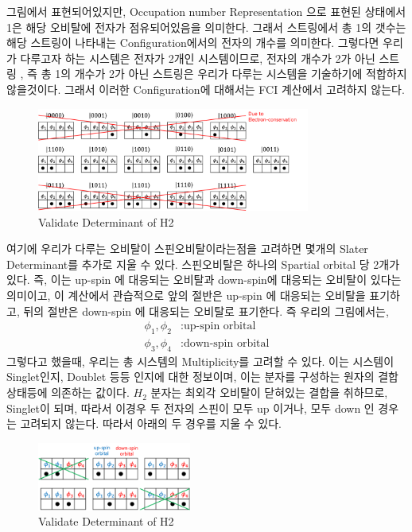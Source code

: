\documentclass[10pt]{article}
\begin{document}
그림에서 표현되어있지만, Occupation number Representation 으로 표현된 상태에서 1은 해당 오비탈에 전자가 점유되어있음을 의미한다. 
그래서 스트링에서 총 1의 갯수는 해당 스트링이 나타내는 Configuration에서의 전자의 개수를 의미한다. 
그렇다면 우리가 다루고자 하는 시스템은 전자가 2개인 시스템이므로, 전자의 개수가 2가 아닌 스트링 , 즉 총 1의 개수가 2가 아닌 스트링은 우리가 다루는 시스템을 기술하기에 적합하지 않을것이다. 
그래서 이러한 Configuration에 대해서는 FCI 계산에서 고려하지 않는다. 
\begin{figure}[htbp]
  \centering
  \includegraphics[width=0.8\textwidth]{fig/Elec_cons.png}
  \caption{Validate Determinant of H2}
  \label{fig:example2}
\end{figure}
여기에 우리가 다루는 오비탈이 스핀오비탈이라는점을 고려하면 몇개의 Slater Determinant를 추가로 지울 수 있다. 
스핀오비탈은 하나의 Spartial orbital 당 2개가 있다. 즉, 이는 up-spin 에 대응되는 오비탈과 down-spin에 대응되는 오비탈이 있다는 의미이고, 
이 계산에서 관습적으로 앞의 절반은 up-spin 에 대응되는 오비탈을 표기하고, 뒤의 절반은 down-spin 에 대응되는 오비탈로 표기한다. 즉 우리의 그림에서는,
\begin{align*}
\phi_1, \phi_2 &: \text{up-spin orbital} \\
\phi_3, \phi_4 &: \text{down-spin orbital}
\end{align*}
그렇다고 했을때, 우리는 총 시스템의 Multiplicity를 고려할 수 있다. 이는 시스템이 Singlet인지, Doublet 등등 인지에 대한 정보이며, 이는 분자를 구성하는 원자의 결합상태등에 의존하는 값이다. 
\(H_2\) 분자는 최외각 오비탈이 닫혀있는 결합을 취하므로, Singlet이 되며, 따라서 이경우 두 전자의 스핀이 모두 up 이거나, 모두 down 인 경우는 고려되지 않는다. 따라서 아래의 두 경우를 지울 수 있다. 
\begin{figure}[htbp]
  \centering
  \includegraphics[width=0.45\textwidth]{fig/spin_cons.png}
  \caption{Validate Determinant of H2}
  \label{fig:example2}
\end{figure}
\end{document}
